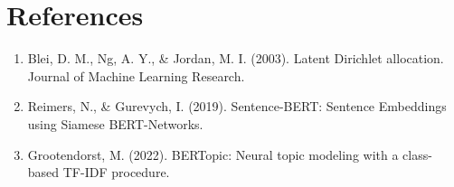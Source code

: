 \documentclass[12pt,a4paper]{article}
\begin{document}
\section{References}
\begin{enumerate}
    \item Blei, D. M., Ng, A. Y., \& Jordan, M. I. (2003). Latent Dirichlet allocation. Journal of Machine Learning Research.
    \item Reimers, N., \& Gurevych, I. (2019). Sentence-BERT: Sentence Embeddings using Siamese BERT-Networks.
    \item Grootendorst, M. (2022). BERTopic: Neural topic modeling with a class-based TF-IDF procedure.
\end{enumerate}
\end{document}
